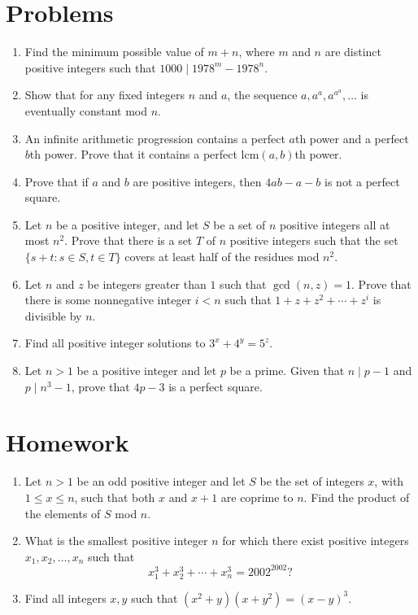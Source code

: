 \documentclass{article}
\newcommand\lcm{\mathrm{lcm}}
\begin{document}
\section{Problems}
\begin{enumerate}
	\item Find the minimum possible value of $m+n$, where $m$ and $n$ are distinct
	      positive integers such that $1000\mid 1978^m-1978^n$.
	\item Show that for any fixed integers $n$ and $a$, the sequence
	      $a,a^a,a^{a^a},\ldots$ is eventually constant mod $n$.
	\item An infinite arithmetic progression contains a perfect $a$th power and a
	      perfect $b$th power. Prove that it contains a perfect $\lcm(a,b)$th power.
	\item Prove that if $a$ and $b$ are positive integers, then $4ab-a-b$ is not a
	      perfect square.
	\item Let $n$ be a positive integer, and let $S$ be a set of $n$ positive
	      integers all at most $n^2$. Prove that there is a set $T$ of $n$ positive
	      integers such that the set $\{s+t:s\in S,t\in T\}$ covers at least half of
	      the residues mod $n^2$.
	\item Let $n$ and $z$ be integers greater than $1$ such that $\gcd(n,z)=1$.
	      Prove that there is some nonnegative integer $i<n$ such that
	      $1+z+z^2+\cdots+z^i$ is divisible by $n$.
	\item Find all positive integer solutions to $3^x+4^y=5^z$.
	\item Let $n>1$ be a positive integer and let $p$ be a prime. Given that
	      $n\mid p-1$ and $p\mid n^3-1$, prove that $4p-3$ is a perfect square.
\end{enumerate}
\newpage
\section{Homework}
\begin{enumerate}
	\item Let $n>1$ be an odd positive integer and let $S$ be the set of integers
	      $x$, with $1\le x\le n$, such that both $x$ and $x+1$ are coprime to $n$.
	      Find the product of the elements of $S$ mod $n$.
	\item What is the smallest positive integer $n$ for which there exist positive
	      integers $x_1,x_2,\ldots,x_n$ such that
	      \[x_1^3+x_2^3+\cdots+x_n^3=2002^{2002}?\]
	\item Find all integers $x,y$ such that $(x^2+y)(x+y^2)=(x-y)^3$.
\end{enumerate}
\end{document}
